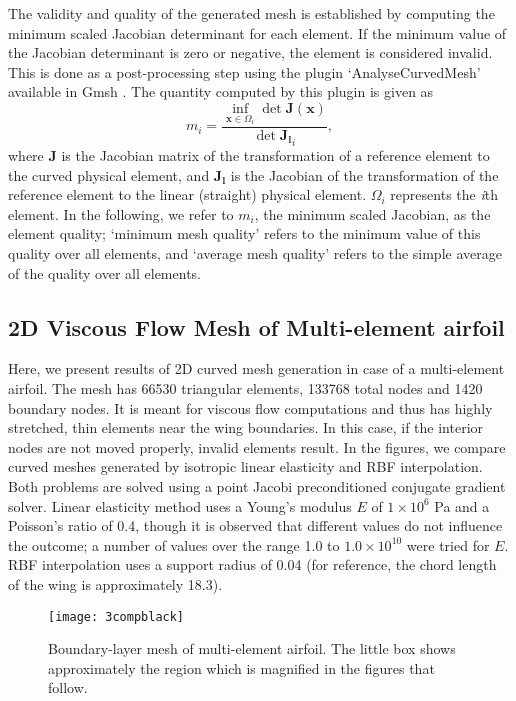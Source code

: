 The validity and quality of the generated mesh is established by computing the minimum scaled Jacobian determinant for each element. If the minimum value of the Jacobian determinant is zero or negative, the element is considered invalid. This is done as a post-processing step using the plugin `AnalyseCurvedMesh' available in Gmsh \cite{gmsh}. The quantity computed by this plugin is given as
 \begin{equation} 
 m_i = \frac{\inf_{\mathbf{x}\in\Omega_i}\det \mathbf{J}(\mathbf{x})}{\det \mathbf{J_l}_i},
 \end{equation}
 where $\mathbf{J}$ is the Jacobian matrix of the transformation of a reference element to the curved physical element, and $\mathbf{J_l}$ is the Jacobian of the transformation of the reference element to the linear (straight) physical element. $\Omega_i$ represents the \emph{i}th element. In the following, we refer to $m_i$, the minimum scaled Jacobian, as the element quality; `minimum mesh quality' refers to the minimum value of this quality over all elements, and `average mesh quality' refers to the simple average of the quality over all elements.
 
 \subsection{2D Viscous Flow Mesh of Multi-element airfoil}
 Here, we present results of 2D curved mesh generation in case of a multi-element airfoil. The mesh has 66530 triangular elements, 133768 total nodes and 1420 boundary nodes. It is meant for viscous flow computations and thus has highly stretched, thin elements near the wing boundaries. In this case, if the interior nodes are not moved properly, invalid elements result. In the figures, we compare curved meshes generated by isotropic linear elasticity and RBF interpolation. Both problems are solved using a point Jacobi preconditioned conjugate gradient solver. Linear elasticity method uses a Young's modulus $E$ of $1\times 10^6$ Pa and a Poisson's ratio of 0.4, though it is observed that different values do not influence the outcome; a number of values over the range 1.0 to $1.0 \times 10^{10}$ were tried for $E$. RBF interpolation uses a support radius of 0.04 (for reference, the chord length of the wing is approximately 18.3).
 
 \begin{figure}
 	\centering
 	\texttt{[image: 3compblack]}
 	\caption{Boundary-layer mesh of multi-element airfoil. The little box shows approximately the region which is magnified in the figures that follow.}
 \end{figure}
 
